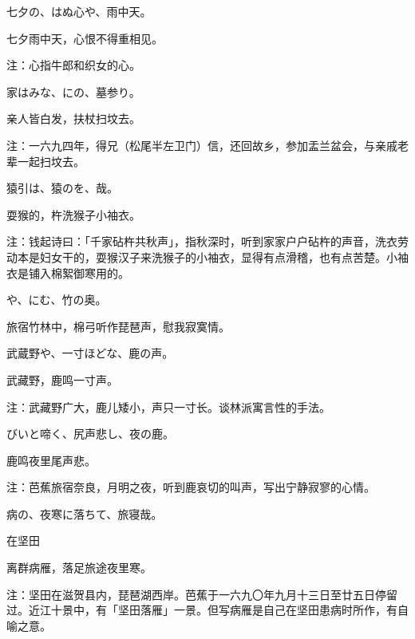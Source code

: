\begin{haiku}
    {\FH 七夕の、はぬ心や、雨中天。}

    {\FK 七夕雨中天，心恨不得重相见。}

    {\FT 注：心指牛郎和织女的心。}
\end{haiku}

\begin{haiku}
    {\FH 家はみな、にの、墓参り。}

    {\FK 亲人皆白发，扶杖扫坟去。}

    {\FT 注：一六九四年，得兄（松尾半左卫门）信，还回故乡，参加盂兰盆会，与亲戚老辈一起扫坟去。}
\end{haiku}

\begin{haiku}
    {\FH 猿引は、猿のを、哉。}

    {\FK 耍猴的，杵洗猴子小袖衣。}

    {\FT 注：钱起诗曰：「千家砧杵共秋声」，指秋深时，听到家家户户砧杵的声音，洗衣劳动本是妇女干的，耍猴汉子来洗猴子的小袖衣，显得有点滑稽，也有点苦楚。小袖衣是铺入棉絮御寒用的。}
\end{haiku}

\begin{haiku}
    {\FH {}や、にむ、竹の奥。}

    {\FK 旅宿竹林中，棉弓听作琵琶声，慰我寂寞情。}
\end{haiku}

\begin{haiku}
    {\FH 武蔵野や、一寸ほどな、鹿の声。}

    {\FK 武藏野，鹿鸣一寸声。}

    {\FT 注：武藏野广大，鹿儿矮小，声只一寸长。谈林派寓言性的手法。}
\end{haiku}

\begin{haiku}
    {\FH びいと啼く、尻声悲し、夜の鹿。}

    {\FK 鹿鸣夜里尾声悲。}

    {\FT 注：芭蕉旅宿奈良，月明之夜，听到鹿哀切的叫声，写出宁静寂寥的心情。}
\end{haiku}

\begin{haiku}
    {\FH 病の、夜寒に落ちて、旅寝哉。}

    {\FK 在坚田}

    {\FK 离群病雁，落足旅途夜里寒。}

    {\FT 注：坚田在滋贺县内，琵琶湖西岸。芭蕉于一六九〇年九月十三日至廿五日停留过。近江十景中，有「坚田落雁」一景。但写病雁是自己在坚田患病时所作，有自喻之意。}
\end{haiku}

